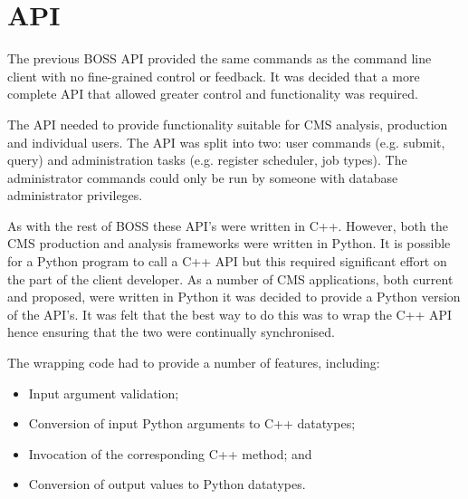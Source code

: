 
\section{API}
The previous BOSS API provided the same commands as the command line client with no fine-grained control or feedback. It was decided that a more complete API that allowed greater control and functionality was required.


The API needed to provide functionality suitable for CMS analysis, production and individual users. The API was split into two: user commands (e.g. submit, query) and administration tasks (e.g. register scheduler, job types). The administrator commands could only be run by someone with database administrator privileges. 



As with the rest of BOSS these API's were written in C++. However, both the CMS production and analysis frameworks were written in Python. It is possible for a Python program to call a C++ API but this required significant effort on the part of the client developer. As a number of CMS applications, both current and proposed, were written in Python it was decided to provide a Python version of the API's. It was felt that the best way to do this was to wrap the C++ API hence ensuring that the two were continually synchronised. 

The wrapping code had to provide a number of features, including:
\begin{itemize}
\item Input argument validation;
\item Conversion of input Python arguments to C++ datatypes;
\item Invocation of the corresponding C++ method; and
\item Conversion of output values to Python datatypes.
\end{itemize}

